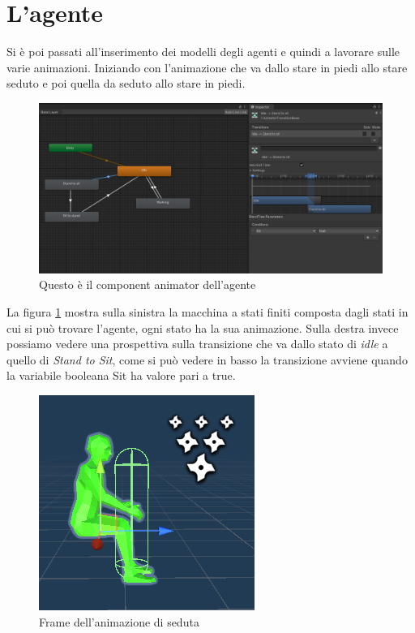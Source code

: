 \documentclass[12pt, openany]{book}
\begin{document}
	\section{L'agente}
	 Si è poi passati all'inserimento dei modelli degli agenti e quindi a lavorare sulle varie animazioni. Iniziando con l'animazione che va dallo stare in piedi allo stare seduto e poi quella da seduto allo stare in piedi.
	\begin{figure}[H]
		\centering
		\includegraphics[width=1\linewidth]{"Immagini/AgentAnimator.png"}
		\caption{Questo è il component animator dell'agente}
		\label{fig:AgentAnimator}
	\end{figure}
	La figura \ref{fig:AgentAnimator} mostra sulla sinistra la macchina a stati finiti composta dagli stati in cui si può trovare l'agente, ogni stato ha la sua animazione. Sulla destra invece possiamo vedere una prospettiva sulla transizione che va dallo stato di \emph{idle} a quello di \emph{Stand to Sit}, come si può vedere in basso la transizione avviene quando la variabile booleana Sit ha valore pari a true.\\
	\begin{figure}[H]
		\centering
		\includegraphics[width=0.8\linewidth]{"Immagini/seduto.png"}
		\caption{Frame dell'animazione di seduta}
		\label{fig:Seduta}
	\end{figure}
\end{document}
